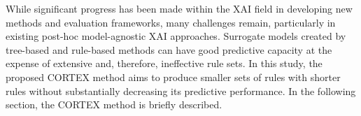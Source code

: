 While significant progress has been made within the XAI field in developing new methods and evaluation frameworks, many challenges remain, particularly in existing post-hoc model-agnostic XAI approaches. Surrogate models created by tree-based and rule-based methods can have good predictive capacity at the expense of extensive and, therefore, ineffective rule sets. In this study, the proposed CORTEX method aims to produce smaller sets of rules with shorter rules without substantially decreasing its predictive performance. In the following section, the CORTEX method is briefly described.